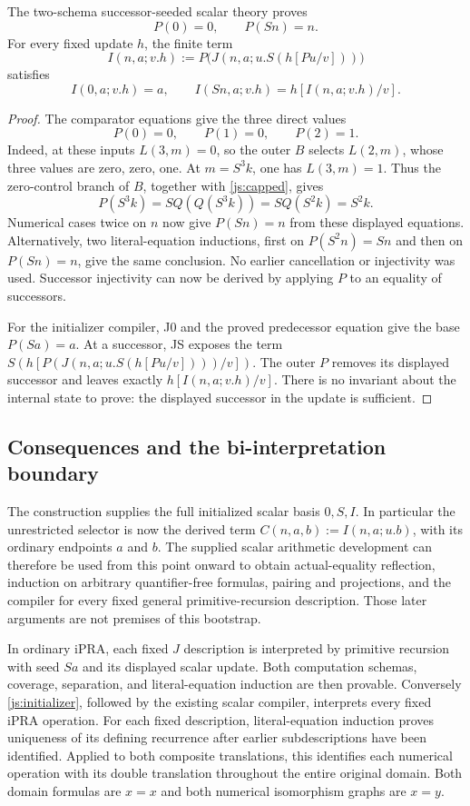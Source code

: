 \begin{theorem}\label{js:recovery}
The two-schema successor-seeded scalar theory proves
\[
 P(0)=0,\qquad P(Sn)=n.
\]
For every fixed update $h$, the finite term
\[
 I(n,a;v.h):=
 P\bigl(J(n,a;u.S(h[Pu/v]))\bigr)
 \tag{Initializer compiler}\label{js:initializer}
\]
satisfies
\[
 I(0,a;v.h)=a,\qquad I(Sn,a;v.h)=h[I(n,a;v.h)/v].
\]
\end{theorem}
\begin{proof}
The comparator equations give the three direct values
\[
 P(0)=0,\qquad P(1)=0,\qquad P(2)=1.
\]
Indeed, at these inputs $L(3,m)=0$, so the outer $B$ selects
$L(2,m)$, whose three values are zero, zero, one.
At $m=S^3k$, one has $L(3,m)=1$.  Thus the zero-control branch
of $B$, together with \eqref{js:capped}, gives
\[
 P(S^3k)=S Q(Q(S^3k))=S Q(S^2k)=S^2k.
\]
Numerical cases twice on $n$ now give $P(Sn)=n$ from these displayed
equations.  Alternatively, two literal-equation inductions, first on
$P(S^2n)=Sn$ and then on $P(Sn)=n$, give the same conclusion.
No earlier cancellation or injectivity was used.  Successor injectivity
can now be derived by applying $P$ to an equality of successors.

For the initializer compiler, J0 and the proved predecessor equation
give the base $P(Sa)=a$.  At a successor, JS exposes the term
$S(h[P(J(n,a;u.S(h[Pu/v])))/v])$.  The outer $P$ removes its
displayed successor and leaves exactly $h[I(n,a;v.h)/v]$.
There is no invariant about the internal state to prove: the displayed
successor in the update is sufficient.
\end{proof}

\subsection{Consequences and the bi-interpretation boundary}

The construction supplies the full initialized scalar basis $0,S,I$.
In particular the unrestricted selector is now the derived term
$C(n,a,b):=I(n,a;u.b)$, with its ordinary endpoints $a$ and $b$.
The supplied scalar arithmetic development can therefore be used from
this point onward to obtain actual-equality reflection, induction on
arbitrary quantifier-free formulas, pairing and projections, and the
compiler for every fixed general primitive-recursion description.
Those later arguments are not premises of this bootstrap.

In ordinary iPRA, each fixed $J$ description is interpreted by primitive
recursion with seed $Sa$ and its displayed scalar update.  Both
computation schemas, coverage, separation, and literal-equation induction
are then provable.  Conversely \eqref{js:initializer}, followed by the
existing scalar compiler, interprets every fixed iPRA operation.
For each fixed description, literal-equation induction proves uniqueness
of its defining recurrence after earlier subdescriptions have been
identified.  Applied to both composite translations, this identifies
each numerical operation with its double translation throughout the
entire original domain.  Both domain formulas are $x=x$ and both
numerical isomorphism graphs are $x=y$.

